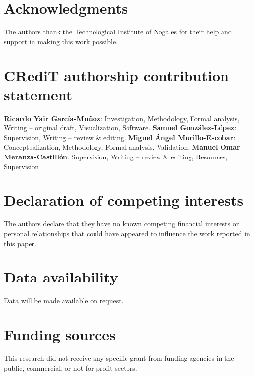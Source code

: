 \documentclass[preprint,12pt]{elsarticle}
\begin{document}
\section*{Acknowledgments}
The authors thank the Technological Institute of Nogales for their help and support in making this work possible.

\section*{CRediT authorship contribution statement}
\textbf{Ricardo Yair García-Muñoz}: Investigation, Methodology, Formal analysis, Writing – original draft, Visualization, Software. \textbf{Samuel González-López}: Supervision, Writing – review \& editing. \textbf{Miguel Ángel Murillo-Escobar}: Conceptualization,
Methodology, Formal analysis, Validation. \textbf{Manuel Omar Meranza-Castillón}: Supervision, Writing – review \& editing, Resources, Supervision

\section*{Declaration of competing interests} 
The authors declare that they have no known competing financial
interests or personal relationships that could have appeared to
influence the work reported in this paper.

\section*{Data availability}
Data will be made available on request.

\section*{Funding sources}
This research did not receive any specific grant from funding agencies in the public, commercial, or not-for-profit sectors.





\end{document}
